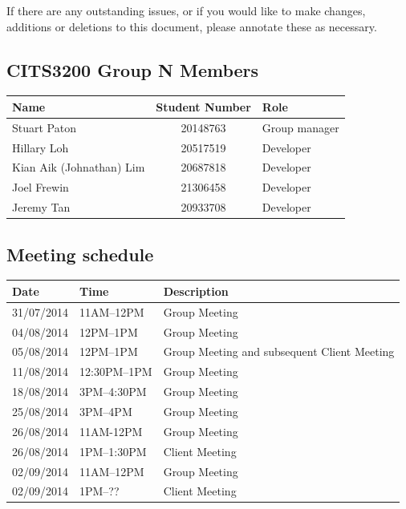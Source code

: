 \documentclass[a4paper, 11pt, titlepage]{article}
\begin{document}
If there are any outstanding issues, or if you would like to make changes, additions or deletions to this document, please annotate these as necessary.


\subsection*{CITS3200 Group N Members}
\begin{table}[H]
\centering
\begin{tabular}{lcl}
	\hline
	Name & Student Number & Role \\
	\hline
	Stuart Paton & 20148763  & Group manager\\
	Hillary Loh & 20517519 & Developer\\
	Kian Aik (Johnathan) Lim & 20687818 & Developer \\
	Joel Frewin & 21306458 & Developer\\
	Jeremy Tan & 20933708 & Developer\\
\end{tabular}
\end{table}


\pagebreak


\subsection*{Meeting schedule}
\begin{table}[H]
\begin{tabularx}{\textwidth}{lll}
\hline
Date & Time & Description \\
\hline
31/07/2014 & 11AM--12PM & Group Meeting \\
04/08/2014 & 12PM--1PM & Group Meeting \\
05/08/2014 & 12PM--1PM & Group Meeting and subsequent Client Meeting \\
11/08/2014 & 12:30PM--1PM & Group Meeting \\
18/08/2014 & 3PM--4:30PM & Group Meeting \\
25/08/2014 & 3PM--4PM & Group Meeting \\
26/08/2014 & 11AM-12PM & Group Meeting \\
26/08/2014 & 1PM--1:30PM & Client Meeting \\
02/09/2014 & 11AM--12PM & Group Meeting \\
02/09/2014 & 1PM--?? & Client Meeting
\end{tabularx}
\end{table}
\end{document}
